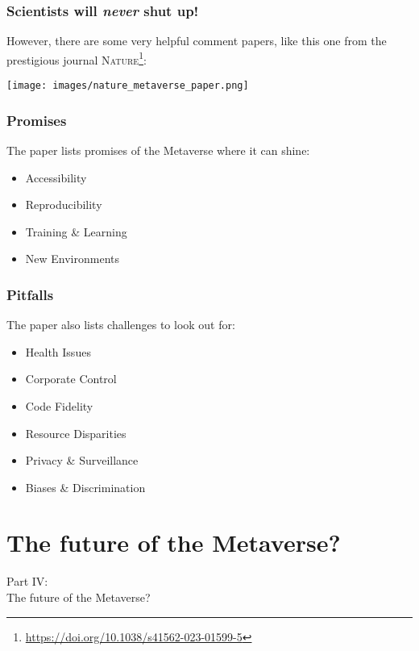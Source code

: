 \documentclass[aspectratio=169,x11names]{beamer}
\begin{document}
\begin{frame}
\frametitle{Scientists will \emph{never} shut up!}
However, there are some very helpful comment papers, like this one from the prestigious journal \textsc{Nature}\footnote{\url{https://doi.org/10.1038/s41562-023-01599-5}}:
\bigskip

\begin{center}
\texttt{[image: images/nature\_metaverse\_paper.png]} 
\end{center}
\end{frame}

\begin{frame}
\frametitle{Promises}
The paper lists promises of the Metaverse where it can shine:
\bigskip

\begin{itemize}
\item Accessibility
\item Reproducibility
\item Training \& Learning
\item New Environments
\end{itemize}
\end{frame}

\begin{frame}
\frametitle{Pitfalls}
The paper also lists challenges to look out for:
\bigskip

\begin{itemize}
\item Health Issues
\item Corporate Control
\item Code Fidelity
\item Resource Disparities
\item Privacy \& Surveillance
\item Biases \& Discrimination
\end{itemize}
\end{frame}

\section{The future of the Metaverse?}

\begin{frame}
\begin{center}
\Large
Part IV:\bigskip\\
\huge
The future of the Metaverse?
\end{center}
\end{frame}
\end{document}
